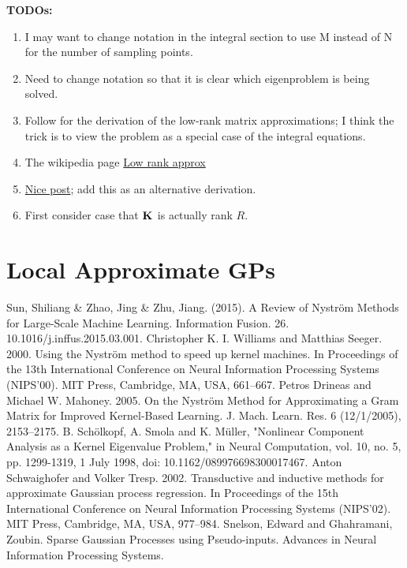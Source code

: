 \documentclass[12pt]{article}
\begin{document}
\bigskip
\textbf{TODOs:}
\begin{enumerate}
\item I may want to change notation in the integral section to use M instead of N for the number of sampling points. 
\item Need to change notation so that it is clear which eigenproblem is being solved.  
\item Follow \cite{Williams} for the derivation of the low-rank matrix approximations; I think the trick is to view the problem as a special case of the integral equations. 
\item The wikipedia page \href{https://en.wikipedia.org/wiki/Low-rank_matrix_approximations is also good.}{Low rank approx}
\item \href{https://stats.stackexchange.com/questions/261149/nystroem-method-for-kernel-approximation}{Nice post}; add this as an alternative derivation. 
\item First consider case that $\mathbf{K}_{}$ is actually rank $R$. 
\end{enumerate}


\section{Local Approximate GPs}

\begin{thebibliography}{20}
 Sun, Shiliang \& Zhao, Jing \& Zhu, Jiang. (2015). A Review of Nyström Methods for Large-Scale Machine Learning. Information Fusion. 26. 10.1016/j.inffus.2015.03.001. 
 Christopher K. I. Williams and Matthias Seeger. 2000. Using the Nyström method to speed up kernel machines. In Proceedings of the 13th International Conference on Neural Information Processing Systems (NIPS'00). MIT Press, Cambridge, MA, USA, 661–667.
 Petros Drineas and Michael W. Mahoney. 2005. On the Nyström Method for Approximating a Gram Matrix for Improved Kernel-Based Learning. J. Mach. Learn. Res. 6 (12/1/2005), 2153–2175.
 B. Schölkopf, A. Smola and K. Müller, "Nonlinear Component Analysis as a Kernel Eigenvalue Problem," in Neural Computation, vol. 10, no. 5, pp. 1299-1319, 1 July 1998, doi: 10.1162/089976698300017467.
 Anton Schwaighofer and Volker Tresp. 2002. Transductive and inductive methods for approximate Gaussian process regression. In Proceedings of the 15th International Conference on Neural Information Processing Systems (NIPS'02). MIT Press, Cambridge, MA, USA, 977–984.
 Snelson, Edward and Ghahramani, Zoubin. Sparse Gaussian Processes using Pseudo-inputs. Advances in Neural Information Processing Systems. %

\end{thebibliography}
\end{document}
